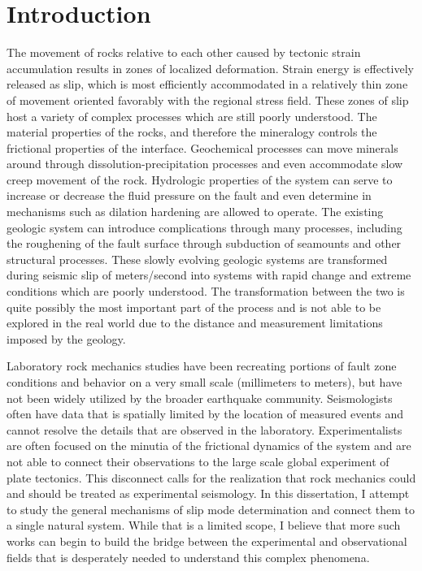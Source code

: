 \chapter*{Introduction}

The movement of rocks relative to each other caused by tectonic strain accumulation results in zones of localized deformation. Strain energy is effectively released as slip, which is most efficiently accommodated in a relatively thin zone of movement oriented favorably with the regional stress field. These zones of slip host a variety of complex processes which are still poorly understood. The material properties of the rocks, and therefore the mineralogy controls the frictional properties of the interface. Geochemical processes can move minerals around through dissolution-precipitation processes and even accommodate slow creep movement of the rock. Hydrologic properties of the system can serve to increase or decrease the fluid pressure on the fault and even determine in mechanisms such as dilation hardening are allowed to operate. The existing geologic system can introduce complications through many processes, including the roughening of the fault surface through subduction of seamounts and other structural processes. These slowly evolving geologic systems are transformed during seismic slip of meters/second into systems with rapid change and extreme conditions which are poorly understood. The transformation between the two is quite possibly the most important part of the process and is not able to be explored in the real world due to the distance and measurement limitations imposed by the geology.

Laboratory rock mechanics studies have been recreating portions of fault zone conditions and behavior on a very small scale (millimeters to meters), but have not been widely utilized by the broader earthquake community. Seismologists often have data that is spatially limited by the location of measured events and cannot resolve the details that are observed in the laboratory. Experimentalists are often focused on the minutia of the frictional dynamics of the system and are not able to connect their observations to the large scale global experiment of plate tectonics. This disconnect calls for the realization that rock mechanics could and should be treated as experimental seismology. In this dissertation, I attempt to study the general mechanisms of slip mode determination and connect them to a single natural system. While that is a limited scope, I believe that more such works can begin to build the bridge between the experimental and observational fields that is desperately needed to understand this complex phenomena.


